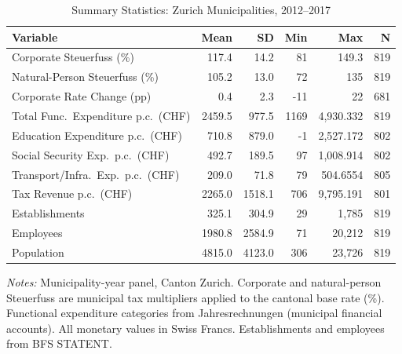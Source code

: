 \begin{table}[htbp]
\centering
\caption{Summary Statistics: Zurich Municipalities, 2012--2017}
\label{tab:summary}
\begin{tabular}{lrrrrr}
\hline\hline
Variable & Mean & SD & Min & Max & N \\
\hline
Corporate Steuerfuss (\%) & 117.4 & 14.2 & 81 & 149.3 & 819 \\
Natural-Person Steuerfuss (\%) & 105.2 & 13.0 & 72 & 135 & 819 \\
Corporate Rate Change (pp) & 0.4 & 2.3 & -11 & 22 & 681 \\
Total Func.\ Expenditure p.c.\ (CHF) & 2459.5 & 977.5 & 1169 & 4,930.332 & 819 \\
Education Expenditure p.c.\ (CHF) & 710.8 & 879.0 & -1 & 2,527.172 & 802 \\
Social Security Exp.\ p.c.\ (CHF) & 492.7 & 189.5 & 97 & 1,008.914 & 802 \\
Transport/Infra.\ Exp.\ p.c.\ (CHF) & 209.0 & 71.8 & 79 & 504.6554 & 805 \\
Tax Revenue p.c.\ (CHF) & 2265.0 & 1518.1 & 706 & 9,795.191 & 801 \\
Establishments & 325.1 & 304.9 & 29 & 1,785 & 819 \\
Employees & 1980.8 & 2584.9 & 71 & 20,212 & 819 \\
Population & 4815.0 & 4123.0 & 306 & 23,726 & 819 \\
\hline\hline
\end{tabular}
\begin{tablenotes}\small
\item \textit{Notes:} Municipality-year panel, Canton Zurich. Corporate and natural-person Steuerfuss are municipal tax multipliers applied to the cantonal base rate (\%). Functional expenditure categories from Jahresrechnungen (municipal financial accounts). All monetary values in Swiss Francs. Establishments and employees from BFS STATENT.
\end{tablenotes}
\end{table}
